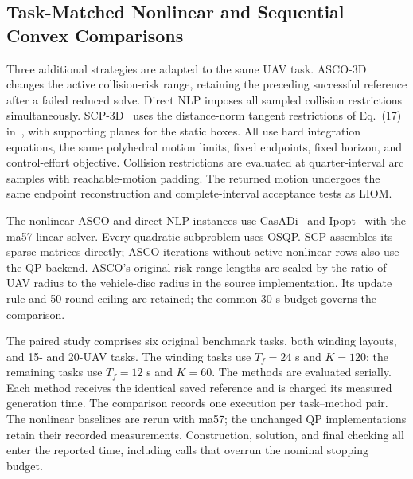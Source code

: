 \subsection{Task-Matched Nonlinear and Sequential Convex Comparisons}
\label{sec:external}
Three additional strategies are adapted to the same UAV task. ASCO-3D~\cite{li2021asco} changes the active collision-risk range, retaining the preceding successful reference after a failed reduced solve. Direct NLP imposes all sampled collision restrictions simultaneously. SCP-3D~\cite{augugliaro2012} uses the distance-norm tangent restrictions of Eq.~(17) in~\cite{augugliaro2012}, with supporting planes for the static boxes. All use hard integration equations, the same polyhedral motion limits, fixed endpoints, fixed horizon, and control-effort objective. Collision restrictions are evaluated at quarter-interval arc samples with reachable-motion padding. The returned motion undergoes the same endpoint reconstruction and complete-interval acceptance tests as LIOM.

The nonlinear ASCO and direct-NLP instances use CasADi~\cite{andersson2019} and Ipopt~\cite{wachter2006} with the ma57 linear solver. Every quadratic subproblem uses OSQP. SCP assembles its sparse matrices directly; ASCO iterations without active nonlinear rows also use the QP backend. ASCO's original risk-range lengths are scaled by the ratio of UAV radius to the vehicle-disc radius in the source implementation. Its update rule and 50-round ceiling are retained; the common 30 s budget governs the comparison.

The paired study comprises six original benchmark tasks, both winding layouts, and 15- and 20-UAV tasks. The winding tasks use $T_f=24$ s and $K=120$; the remaining tasks use $T_f=12$ s and $K=60$. The methods are evaluated serially. Each method receives the identical saved reference and is charged its measured generation time. The comparison records one execution per task--method pair. The nonlinear baselines are rerun with ma57; the unchanged QP implementations retain their recorded measurements. Construction, solution, and final checking all enter the reported time, including calls that overrun the nominal stopping budget.




